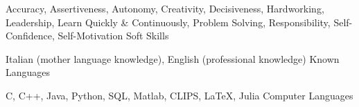 

\begin{cventries}

  \cventry
      {Accuracy, Assertiveness, Autonomy, Creativity, Decisiveness, Hardworking, Leadership, Learn Quickly \& Continuously, Problem Solving, Responsibility, Self-Confidence, Self-Motivation}
    {Soft Skills}
    {}
    {}
    {}

  \cventry
    {Italian (mother language knowledge), English (professional knowledge)}
    {Known Languages}
    {}
    {}
    {}

  \cventry
    {C, C++, Java, Python, SQL, Matlab, CLIPS, LaTeX, Julia}
    {Computer Languages}
    {}
    {}
    {}

\end{cventries}

